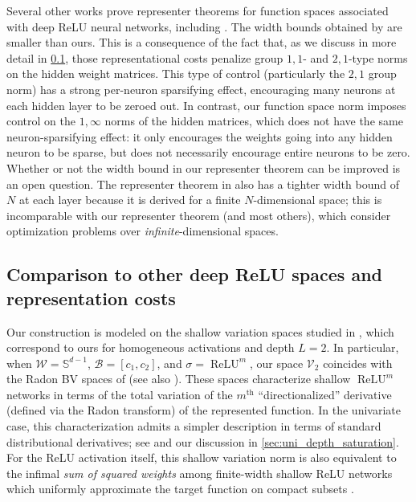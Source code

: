 \documentclass{article}
\DeclareMathOperator{\ReLU}{\mathrm{ReLU}}
\def\cB{{\mathcal{B}}}
\def\cV{{\mathcal{V}}}
\def\cW{{\mathcal{W}}}
\def\bS{{\mathbb{S}}}
\begin{document}
Several other works prove representer theorems for function spaces associated with deep ReLU neural networks, including \cite{parhi2022kinds,shenouda2024variation,bartolucci2024neural,heeringa2025deep}. The width bounds obtained by \cite{parhi2022kinds,shenouda2024variation,bartolucci2024neural} are smaller than ours. This is a consequence of the fact that, as we discuss in more detail in \cref{sec:relationship_other_spaces}, those representational costs penalize group $1,1$- and $2,1$-type norms on the hidden weight matrices. This type of control (particularly the $2,1$ group norm) has a strong per-neuron sparsifying effect, encouraging many neurons at each hidden layer to be zeroed out. In contrast, our function space norm imposes control on the $1,\infty$ norms of the hidden matrices, which does not have the same neuron-sparsifying effect: it only encourages the weights going into any hidden neuron to be sparse, but does not necessarily encourage entire neurons to be zero. Whether or not the width bound in our representer theorem can be improved is an open question. The representer theorem in \cite{heeringa2024embeddings} also has a tighter width bound of $N$ at each layer because it is derived for a finite $N$-dimensional space; this is incomparable with our representer theorem (and most others), which consider optimization problems over \textit{infinite}-dimensional spaces.






\subsection{Comparison to other deep ReLU spaces and representation costs} \label{sec:relationship_other_spaces}

Our construction is modeled on the shallow variation spaces studied in \cite{siegel2023characterization}, which correspond to ours for homogeneous activations and depth $L=2$. In particular, when $\cW = \bS^{d-1}$, $\cB = [c_1,c_2]$, and $\sigma = \ReLU^m$, our space $\cV_2$ coincides with the Radon BV spaces of \cite{parhi2021banach,ongie2019function} (see also \cite{bartolucci2023understanding}). These spaces characterize shallow $\ReLU^m$ networks in terms of the total variation of the $m^\textrm{th}$ ``directionalized'' derivative (defined via the Radon transform) of the represented function. In the univariate case, this characterization admits a simpler description in terms of standard distributional derivatives; see \cite{savarese2019infinite} and our discussion in \cref{sec:uni_depth_saturation}. For the ReLU activation itself, this shallow variation norm is also equivalent to the infimal \textit{sum of squared weights} among finite-width shallow ReLU networks which uniformly approximate the target function on compact subsets \citep[Equation~7]{ongie2019function}. 
\end{document}
